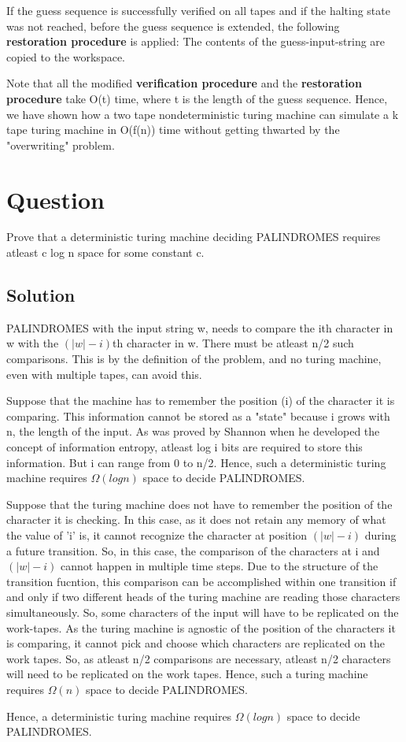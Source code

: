 \documentclass[10pt]{amsart}
\theoremstyle{remark}
\begin{document}
If the guess sequence is successfully verified on all tapes and if the halting state was not reached, before the guess sequence is extended, the following \textbf{restoration procedure} is applied: The contents of the guess-input-string are copied to the workspace.

Note that all the modified \textbf{verification procedure} and the \textbf{restoration procedure} take O(t) time, where t is the length of the guess sequence. Hence, we have shown how a two tape nondeterministic turing machine can simulate a k tape turing machine in O(f(n)) time without getting thwarted by the "overwriting" problem.


\section{Question}
Prove that a deterministic turing machine deciding PALINDROMES requires atleast c log n space for some constant c.
\subsection{Solution}
PALINDROMES with the input string w, needs to compare the ith character in w with the $(|w|-i)$th character in w. There must be atleast n/2 such comparisons. This is by the definition of the problem, and no turing machine, even with multiple tapes, can avoid this.

Suppose that the machine has to remember the position (i) of the character it is comparing. This information cannot be stored as a "state" because i grows with n, the length of the input. As was proved by Shannon when he developed the concept of information entropy, atleast log i bits are required to store this information. But i can range from 0 to n/2. Hence, such a deterministic turing machine requires $\Omega(log n)$ space to decide PALINDROMES.

Suppose that the turing machine does not have to remember the position of the character it is checking. In this case, as it does not retain any memory of what the value of 'i' is, it cannot recognize the character at position $(|w|-i)$ during a future transition. So, in this case, the comparison of the characters at i and $(|w|-i)$ cannot happen in multiple time steps. Due to the structure of the transition fucntion, this comparison can be accomplished within one transition if and only if two different heads of the turing machine are reading those characters simultaneously. So, some characters of the input will have to be replicated on the work-tapes. As the turing machine is agnostic of the position of the characters it is comparing, it cannot pick and choose which characters are replicated on the work tapes. So, as atleast n/2 comparisons are necessary, atleast n/2 characters will need to be replicated on the work tapes. Hence, such a turing machine requires $\Omega(n)$ space to decide PALINDROMES.

Hence, a deterministic turing machine requires $\Omega(log n)$ space to decide PALINDROMES.

% 
% 
\end{document}
